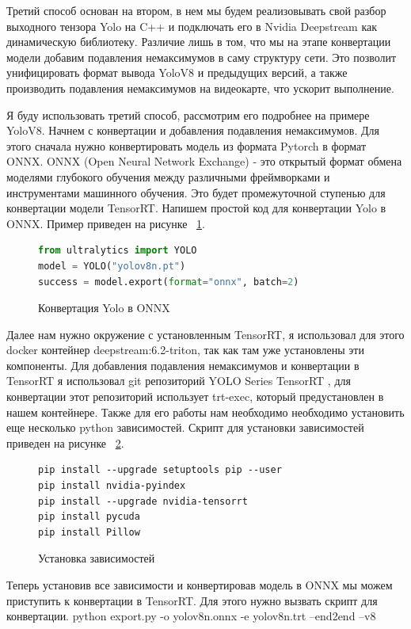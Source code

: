 Третий способ основан на втором, в нем мы будем реализовывать свой разбор выходного тензора Yolo на C++ и подключать его в Nvidia Deepstream как динамическую библиотеку. Различие лишь в том, что мы на этапе конвертации модели добавим подавления немаксимумов в саму структуру сети. Это позволит унифицировать формат вывода YoloV8 и предыдущих версий, а также производить подавления немаксимумов на видеокарте, что ускорит выполнение.

Я буду использовать третий способ, рассмотрим его подробнее на примере YoloV8. Начнем с конвертации и добавления подавления немаксимумов. Для этого сначала нужно конвертировать модель из формата Pytorch в формат ONNX. ONNX (Open Neural Network Exchange) - это открытый формат обмена моделями глубокого обучения между различными фреймворками и инструментами машинного обучения. Это будет промежуточной ступенью для конвертации модели TensorRT. Напишем простой код для конвертации Yolo в ONNX. Пример приведен на рисунке ~\ref{src:src2}.

\begin{figure}
\begin{lstlisting}[language=Python]
from ultralytics import YOLO
model = YOLO("yolov8n.pt")
success = model.export(format="onnx", batch=2)
\end{lstlisting}
\caption{Конвертация Yolo в ONNX}
\label{src:src2}
\end{figure}

Далее нам нужно окружение с установленным TensorRT, я использовал для этого docker контейнер deepstream:6.2-triton, так как там уже установлены эти компоненты. Для добавления подавления немаксимумов и конвертации в TensorRT я использовал git репозиторий YOLO Series TensorRT \cite{yolotrt2022}, для конвертации этот репозиторий использует trt-exec, который предустановлен в нашем контейнере. Также для его работы нам необходимо необходимо установить еще несколько python зависимостей. Скрипт для установки зависимостей приведен на рисунке ~\ref{src:src2_1}.

\begin{figure}
\begin{lstlisting}
pip install --upgrade setuptools pip --user
pip install nvidia-pyindex
pip install --upgrade nvidia-tensorrt
pip install pycuda
pip install Pillow
\end{lstlisting}
\caption{Установка зависимостей}
\label{src:src2_1}
\end{figure}

Теперь установив все зависимости и конвертировав модель в ONNX мы можем приступить к конвертации в TensorRT. Для этого нужно вызвать скрипт для конвертации. 
python export.py -o yolov8n.onnx -e yolov8n.trt --end2end --v8

